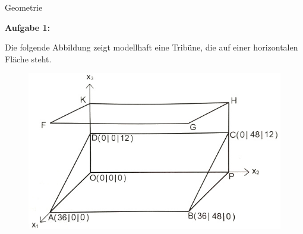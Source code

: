 \documentclass[a4paper,12pt]{article}
\newcommand{\Aufgabe}[1]{
  {
  \vspace*{0.5cm}
  \textsf{\textbf{Aufgabe #1}}
  \vspace*{0.2cm}
  
  }
}
\begin{document}
\vspace{0,5cm} Geometrie

\Aufgabe{1:}
Die folgende Abbildung zeigt modellhaft eine Tribüne, die auf einer horizontalen Fläche steht.

\begin{figure}[h!]
  \begin{center}
    \includegraphics[width=0.7\linewidth]{tribüne.jpg}
  \end{center}
\end{figure}
\end{document}
